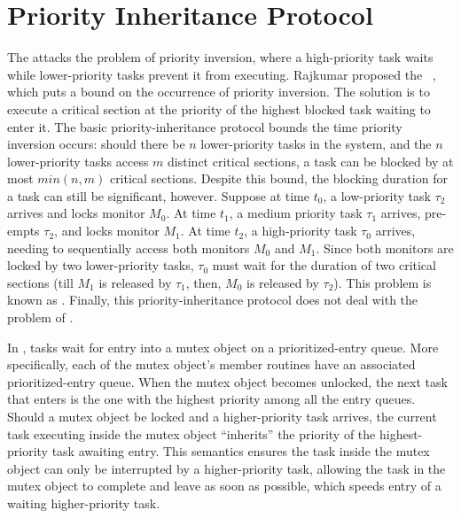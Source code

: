 \documentclass[openright,twoside]{report}
\begin{document}
\section{Priority Inheritance Protocol}
\label{s:PriorityInheritanceProtocol}

The  attacks the problem of priority inversion, where a high-priority task waits while lower-priority tasks prevent it from executing.
Rajkumar proposed the ~\cite{Rajkumar88,Sha90b,Rajkumar91}, which puts a bound on the occurrence of priority inversion.
The solution is to execute a critical section at the priority of the highest blocked task waiting to enter it.
The basic priority-inheritance protocol bounds the time priority inversion occurs: should there be $n$ lower-priority tasks in the system, and the $n$ lower-priority tasks access $m$ distinct critical sections, a task can be blocked by at most $min(n,m)$ critical sections.
Despite this bound, the blocking duration for a task can still be significant, however.
Suppose at time $t_0$, a low-priority task $\tau_2$ arrives and locks monitor $M_0$.
At time $t_1$, a medium priority task $\tau_1$ arrives, pre-empts $\tau_2$, and locks monitor $M_1$.
At time $t_2$, a high-priority task $\tau_0$ arrives, needing to sequentially access both monitors $M_0$ and $M_1$.
Since both monitors are locked by two lower-priority tasks, $\tau_0$ must wait for the duration of two critical sections (till $M_1$ is released by $\tau_1$, then, $M_0$ is released by $\tau_2$).
This problem is known as .
Finally, this priority-inheritance protocol does not deal with the problem of .

In \uC, tasks wait for entry into a mutex object on a prioritized-entry queue.
More specifically, each of the mutex object's member routines have an associated prioritized-entry queue.
When the mutex object becomes unlocked, the next task that enters is the one with the highest priority among all the entry queues.
Should a mutex object be locked and a higher-priority task arrives, the current task executing inside the mutex object ``inherits'' the priority of the highest-priority task awaiting entry.
This semantics ensures the task inside the mutex object can only be interrupted by a higher-priority task, allowing the task in the mutex object to complete and leave as soon as possible, which speeds entry of a waiting higher-priority task.
\end{document}
